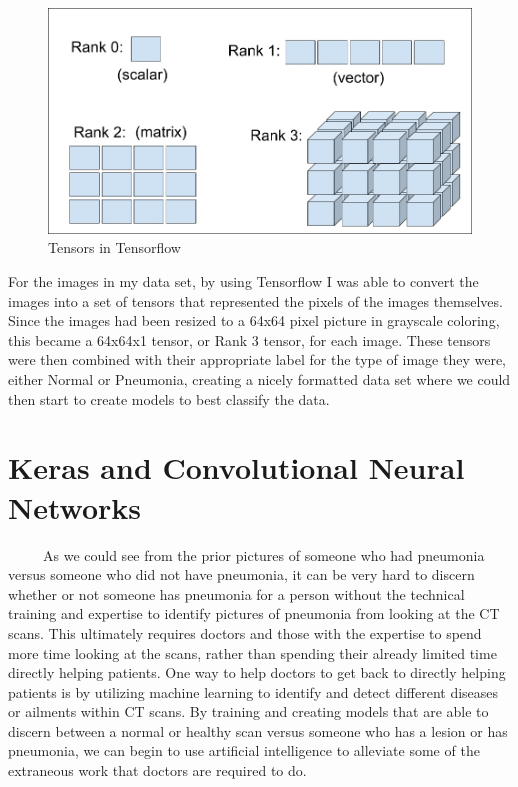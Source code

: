 \documentclass[12pt]{article}
\begin{document}
\begin{figure}

{\centering \includegraphics[width=0.75\linewidth,height=0.25\textheight]{images/tensors} 

}

\caption{Tensors in Tensorflow}\label{fig:sample-fig4}
\end{figure}

For the images in my data set, by using Tensorflow I was able to convert
the images into a set of tensors that represented the pixels of the
images themselves. Since the images had been resized to a 64x64 pixel
picture in grayscale coloring, this became a 64x64x1 tensor, or Rank 3
tensor, for each image. These tensors were then combined with their
appropriate label for the type of image they were, either Normal or
Pneumonia, creating a nicely formatted data set where we could then
start to create models to best classify the data.

\hypertarget{keras-and-convolutional-neural-networks}{%
\section{Keras and Convolutional Neural
Networks}\label{keras-and-convolutional-neural-networks}}

~~~~~As we could see from the prior pictures of someone who had
pneumonia versus someone who did not have pneumonia, it can be very hard
to discern whether or not someone has pneumonia for a person without the
technical training and expertise to identify pictures of pneumonia from
looking at the CT scans. This ultimately requires doctors and those with
the expertise to spend more time looking at the scans, rather than
spending their already limited time directly helping patients. One way
to help doctors to get back to directly helping patients is by utilizing
machine learning to identify and detect different diseases or ailments
within CT scans. By training and creating models that are able to
discern between a normal or healthy scan versus someone who has a lesion
or has pneumonia, we can begin to use artificial intelligence to
alleviate some of the extraneous work that doctors are required to do.
\end{document}
